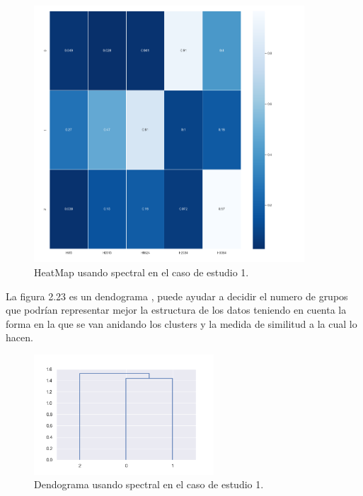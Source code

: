 	\begin{figure}[htb]
		\centering
		\includegraphics[width=0.9\textwidth]{./imagenes/caso1/heatmap_caso1_spectral}
		\caption{HeatMap usando spectral en el caso de estudio 1.} \label{fig:1}
	\end{figure}


	La figura 2.23 es un dendograma , puede ayudar a decidir el numero de grupos que podrían representar
	mejor la estructura de los datos teniendo en cuenta la forma en la que se van anidando los clusters
	y la medida de similitud a la cual lo hacen. \\

	\begin{figure}[htb]
		\centering
		\includegraphics[width=0.6\textwidth]{./imagenes/caso1/dendograma_caso1_spectral}
		\caption{Dendograma usando spectral en el caso de estudio 1.} \label{fig:1}
	\end{figure}

